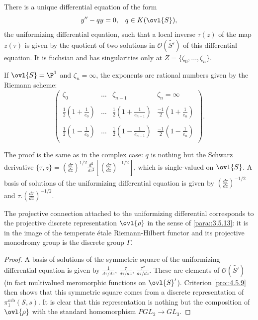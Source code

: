\begin{pro}\label{pro::4.6.3} There is a unique differential equation of
 the form
 \begin{equation*}
  y''- qy=0,\;\;\; q\in K(\ovl{S}),
 \end{equation*}
 the {\rm uniformizing differential equation}, such that a local inverse
 $\tau(z)$ of the map $z(\tau)$ is given by the quotient of two solutions in
 $\mathcal{O}(\widetilde{ S'})$ of this differential equation. It is
 fuchsian and has singularities only at $Z=\{\zeta_0,\ldots ,\zeta_n\}$. 

 \hfill\break If $\ovl{S}=\P^1$ and $\zeta_n=\infty$, the exponents are
 rational numbers given 
 by the Riemann scheme:
\begin{equation*}
 \begin{pmatrix}
  \zeta_0 & \ldots & \zeta_{n-1} & \zeta_n=\infty \\
  &&&\\\frac{1}{2}(1+\frac{1}{e_0})&
  \ldots &\frac{1}{2}(1+\frac{1}{e_{n-1}})& \frac{-1}{2}(1+\frac{1}{e_{n}}) \\
  \\
  \frac{1}{2}(1-\frac{1}{e_0})&
  \ldots &\frac{1}{2}(1-\frac{1}{e_{n-1}})& \frac{-1}{2}(1-\frac{1}{e_{n}}) \\
 \end{pmatrix}.
\end{equation*}
\end{pro}

 \noindent The proof is the same as in the complex case: $q$ is nothing
 but the Schwarz derivative $\{\tau, z\}= 
 (\frac{d\tau}{dz})^{1/2}\frac{d^2}{dz^2}[(\frac{d\tau}{dz})^{-1/2}]$,
 which is single-valued on $\ovl{S}$. A basis of solutions of the
 uniformizing differential equation is given by
 $(\frac{d\tau}{dz})^{-1/2}$ and $\tau.(\frac{d\tau}{dz})^{-1/2}$.

\begin{pro}\label{pro::4.6.4} The projective connection attached to the
 uniformizing differential corresponds to the projective discrete
 representation $\ovl{\rho}$ in the sense of \ref{para::3.5.13}: it is
 in the image 
 of the temperate \'etale Riemann-Hilbert functor and its projective
 monodromy group is the discrete group $\Gamma$.
\end{pro}

\begin{proof}
 A basis of solutions of the symmetric square of the uniformizing 
 differential equation is given by $\frac{1}{{d\tau/
 dz}},\,\frac{\tau}{{d\tau/ dz}},\,\frac{\tau^2}{{d\tau/dz}} $. These 
 are elements of $\mathcal{O}(\widetilde{  S'})$ (in fact multivalued 
 meromorphic functions on $\ovl{S}'$). Criterion \ref{pro::4.5.9} then
 shows that 
 this symmetric square comes from a discrete representation of 
 $\pi_1^{\mathrm{orb}}(\mathcal{S},s) $. It is clear that this representation is 
 nothing but the composition of $\ovl{\rho}$ with the 
 standard homomorphism $PGL_2\to GL_3$. 
\end{proof}

